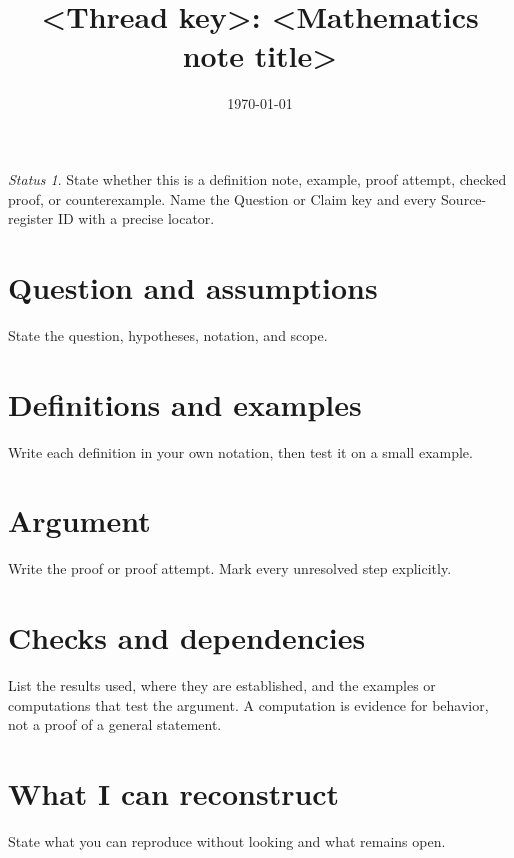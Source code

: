 \documentclass[11pt]{article}
\title{<Thread key>: <Mathematics note title>}
\author{}
\date{\today}
\theoremstyle{definition}
\theoremstyle{remark}
\newtheorem*{status}{Status}
\begin{document}
\maketitle

\begin{status}
State whether this is a definition note, example, proof attempt, checked proof, or counterexample.
Name the Question or Claim key and every Source-register ID with a precise locator.
\end{status}

\section{Question and assumptions}

State the question, hypotheses, notation, and scope.

\section{Definitions and examples}

Write each definition in your own notation, then test it on a small example.

\section{Argument}

Write the proof or proof attempt. Mark every unresolved step explicitly.

\section{Checks and dependencies}

List the results used, where they are established, and the examples or computations that test the
argument. A computation is evidence for behavior, not a proof of a general statement.

\section{What I can reconstruct}

State what you can reproduce without looking and what remains open.
\end{document}
